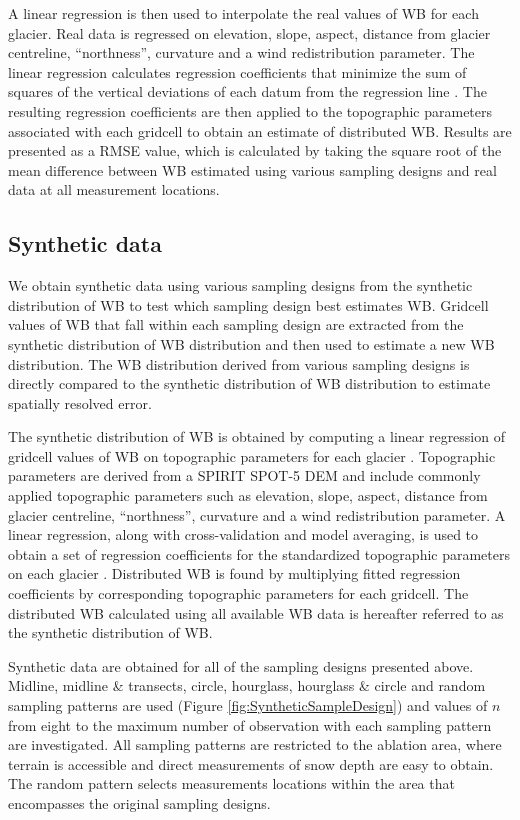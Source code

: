 \documentclass[twocolumn,letterpaper]{igs}
\begin{document}
A linear regression is then used to interpolate the real values of WB for each glacier. Real data is regressed on elevation, slope, aspect, distance from glacier centreline, ``northness'', curvature and a wind redistribution parameter. The linear regression calculates regression coefficients that minimize the sum of squares of the vertical deviations of each datum from the regression line \citep{Davis1986}. The resulting regression coefficients are then applied to the topographic parameters associated with each gridcell to obtain an estimate of distributed WB. Results are presented as a RMSE value, which is calculated by taking the square root of the mean difference between WB estimated using various sampling designs and real data at all measurement locations.


\subsection{Synthetic data}

We obtain synthetic data using various sampling designs from the synthetic distribution of WB to test which sampling design best estimates WB. Gridcell values of WB that fall within each sampling design are extracted from the synthetic distribution of WB distribution and then used to estimate a new WB distribution. The WB distribution derived from various sampling designs is directly compared to the synthetic distribution of WB distribution to estimate spatially resolved error. 

The synthetic distribution of WB is obtained by computing a linear regression of gridcell values of WB on topographic parameters for each glacier \citep{Pulwicki2017}. Topographic parameters are derived from a SPIRIT SPOT-5 DEM \citep{Korona2009} and include commonly applied topographic parameters \citep[e.g.][]{McGrath2015} such as elevation, slope, aspect, distance from glacier centreline, ``northness'', curvature and a wind redistribution parameter. A linear regression, along with cross-validation and model averaging, is used to obtain a set of regression coefficients for the standardized topographic parameters on each glacier \citep{Pulwicki2017}. Distributed WB is found by multiplying fitted regression coefficients by corresponding topographic parameters for each gridcell. The distributed WB calculated using all available WB data is hereafter referred to as the synthetic distribution of WB.

Synthetic data are obtained for all of the sampling designs presented above. Midline, midline \& transects, circle, hourglass, hourglass \& circle and random sampling patterns are used (Figure \ref{fig:SyntheticSampleDesign}) and values of $n$ from eight to the maximum number of observation with each sampling pattern are investigated. All sampling patterns are restricted to the ablation area, where terrain is accessible and direct measurements of snow depth are easy to obtain. The random pattern selects measurements locations within the area that encompasses the original sampling designs.
\end{document}
